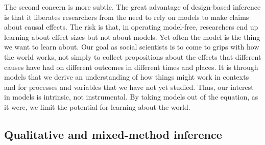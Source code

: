 \documentclass[
  12pt,
]{book}
\begin{document}
The second concern is more subtle. The great advantage of design-based inference is that it liberates researchers from the need to rely on models to make claims about causal effects. The risk is that, in operating model-free, researchers end up learning about effect sizes but not about models. Yet often the model is the thing we want to learn about. Our goal as social scientists is to come to grips with how the world works, not simply to collect propositions about the effects that different causes have had on different outcomes in different times and places. It is through models that we derive an understanding of how things might work in contexts and for processes and variables that we have not yet studied. Thus, our interest in models is intrinsic, not instrumental. By taking models out of the equation, as it were, we limit the potential for learning about the world.

\hypertarget{qualitative-and-mixed-method-inference}{%
\subsection{Qualitative and mixed-method inference}\label{qualitative-and-mixed-method-inference}}
\end{document}
